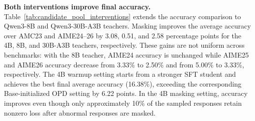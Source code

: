 \textbf{Both interventions improve final accuracy.}
Table~\ref{tab:candidate_pool_interventions} extends the accuracy comparison to Qwen3-8B and Qwen3-30B-A3B teachers.
Masking improves the average accuracy over AMC23 and AIME24--26 by 3.08, 0.51, and 2.58 percentage points for the 4B, 8B, and 30B-A3B teachers, respectively.
These gains are not uniform across benchmarks: with the 8B teacher, AIME24 accuracy is unchanged while AIME25 and AIME26 accuracy decrease from 3.33\% to 2.50\% and from 5.00\% to 3.33\%, respectively.
The 4B warmup setting starts from a stronger SFT student and achieves the best final average accuracy (16.38\%), exceeding the corresponding Base-initialized OPD setting by 6.22 points.
In the 4B masking setting, accuracy improves even though only approximately 10\% of the sampled responses retain nonzero loss after abnormal responses are masked.
